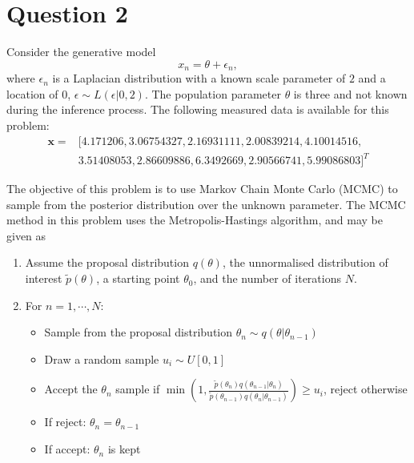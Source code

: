 \documentclass{article}
\begin{document}
	\clearpage
	
	\section{Question 2}
	
	Consider the generative model
	\begin{equation}
		x_n = \theta + \epsilon_n,
	\end{equation}
	where $\epsilon_n$ is a Laplacian distribution with a known scale parameter of $2$ and a location of $0$, $\epsilon \sim L(\epsilon \vert 0, 2)$. The population parameter $\theta$ is three and not known during the inference process. The following measured data is available for this problem:
	\begin{equation}
		\begin{aligned}
		\mathbf{x} = &[4.171206 , 3.06754327, 2.16931111, 2.00839214, 4.10014516, \\
		& 3.51408053, 2.86609886, 6.3492669 , 2.90566741, 5.99086803]^T
		\end{aligned}
	\end{equation}
	
	The objective of this problem is to use Markov Chain Monte Carlo (MCMC) to sample from the posterior distribution over the unknown parameter. The MCMC method in this problem uses the Metropolis-Hastings algorithm, and may be given as
	\begin{enumerate}
		\item Assume the proposal distribution $q(\theta)$, the unnormalised distribution of interest $\tilde{p}(\theta)$, a starting point $\theta_0$, and the number of iterations $N$.
		\item For $n = 1, \cdots, N$:
		\begin{itemize}
			\item Sample from the proposal distribution $\theta_{n} \sim q(\theta \vert \theta_{n - 1})$
			\item Draw a random sample $u_i \sim U[0, 1]$
			\item Accept the $\theta_n$ sample if $\min \left( 1, \frac{\tilde{p}(\theta_{n}) q(\theta_{n - 1} \vert \theta_{n}) }{\tilde{p}(\theta_{n - 1}) q(\theta_{n} \vert \theta_{n - 1})} \right) \geq u_i$, reject otherwise
			\item If reject: $\theta_{n} = \theta_{n - 1}$
			\item If accept: $\theta_{n}$ is kept
		\end{itemize}
	\end{enumerate}
\end{document}
